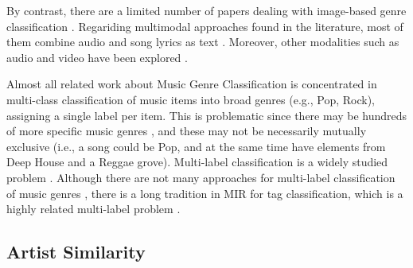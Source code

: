 
By contrast, there are a limited number of papers dealing with image-based genre classification \citep{libeks2011you}.
Regariding multimodal approaches found in the literature, most of them combine audio and song lyrics as text \citep{laurier2008multimodal,neumayer2007integration}. 
Moreover, other modalities such as audio and video have been explored \citep{schindler2015audio}. 

Almost all related work about Music Genre Classification is concentrated in multi-class classification of music items into broad genres (e.g., Pop, Rock), assigning a single label per item. This is problematic since there may be hundreds of more specific music genres \citep{pachet2000taxonomy}, and these may not be necessarily mutually exclusive (i.e., a song could be Pop, and at the same time have elements from Deep House and a Reggae grove). 
Multi-label classification is a widely studied problem \citep{tsoumakas2006multi,jain2016extreme}. 
Although there are not many approaches for multi-label classification of music genres \citep{Sanden2011,wang2009tag}, there is a long tradition in MIR for tag classification, which is a highly related multi-label problem \citep{Choi2016,wang2009tag}.


\subsection{Artist Similarity}
\label{sec:SOA:mir:similarity}

